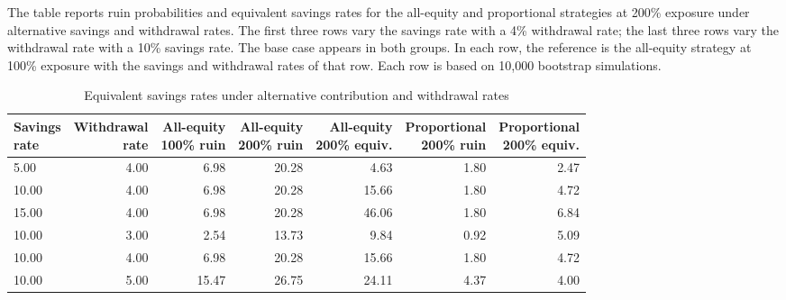 \begin{table}[p]\centering
\caption{Equivalent savings rates under alternative contribution and withdrawal rates}\label{tab:restored-policy}
\begin{minipage}{\linewidth}\small The table reports ruin probabilities and equivalent savings rates for the all-equity and proportional strategies at 200\% exposure under alternative savings and withdrawal rates. The first three rows vary the savings rate with a 4\% withdrawal rate; the last three rows vary the withdrawal rate with a 10\% savings rate. The base case appears in both groups. In each row, the reference is the all-equity strategy at 100\% exposure with the savings and withdrawal rates of that row. Each row is based on 10,000 bootstrap simulations.\end{minipage}
\medskip

{\small\setlength{\tabcolsep}{4pt}\begin{tabular}{lrrrrrr}\toprule
\shortstack{Savings\\ rate} & \shortstack{Withdrawal\\ rate} & \shortstack{All-equity\\ 100\% ruin} & \shortstack{All-equity\\ 200\% ruin} & \shortstack{All-equity\\ 200\% equiv.} & \shortstack{Proportional\\ 200\% ruin} & \shortstack{Proportional\\ 200\% equiv.} \\ \midrule
5.00 & 4.00 & 6.98 & 20.28 & 4.63 & 1.80 & 2.47 \\
10.00 & 4.00 & 6.98 & 20.28 & 15.66 & 1.80 & 4.72 \\
15.00 & 4.00 & 6.98 & 20.28 & 46.06 & 1.80 & 6.84 \\
10.00 & 3.00 & 2.54 & 13.73 & 9.84 & 0.92 & 5.09 \\
10.00 & 4.00 & 6.98 & 20.28 & 15.66 & 1.80 & 4.72 \\
10.00 & 5.00 & 15.47 & 26.75 & 24.11 & 4.37 & 4.00 \\
\bottomrule\end{tabular}}
\end{table}
